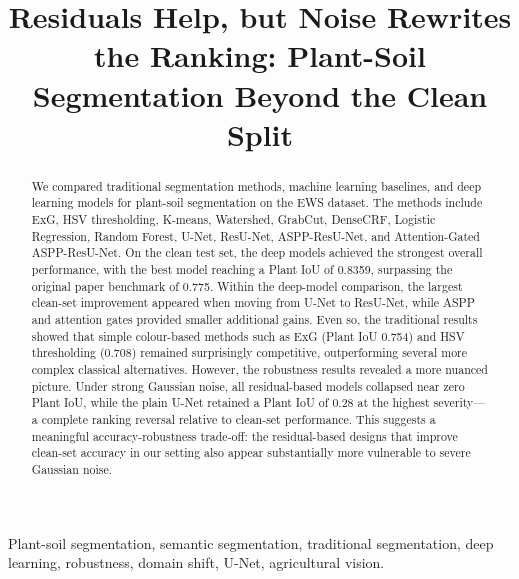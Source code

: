\documentclass[conference]{IEEEtran}
\begin{document}
\title{Residuals Help, but Noise Rewrites the Ranking: Plant-Soil Segmentation Beyond the Clean Split}

\author{
}

\maketitle

\begin{abstract}
We compared traditional segmentation methods, machine learning
baselines, and deep learning models for plant-soil segmentation on the
EWS dataset. The methods include ExG, HSV thresholding, K-means,
Watershed, GrabCut, DenseCRF, Logistic Regression, Random Forest, U-Net,
ResU-Net, ASPP-ResU-Net, and Attention-Gated ASPP-ResU-Net. On the clean
test set, the deep models achieved the strongest overall performance,
with the best model reaching a Plant IoU of 0.8359, surpassing the
original paper benchmark of 0.775. Within the deep-model comparison,
the largest clean-set improvement appeared when moving from U-Net to
ResU-Net, while ASPP and attention gates provided smaller additional
gains. Even so, the traditional results showed that simple colour-based
methods such as ExG (Plant IoU 0.754) and HSV thresholding (0.708)
remained surprisingly competitive, outperforming several more complex
classical alternatives. However, the robustness results revealed a more
nuanced picture. Under strong Gaussian noise, all residual-based models
collapsed near zero Plant IoU, while the plain U-Net retained a Plant
IoU of 0.28 at the highest severity---a complete ranking reversal
relative to clean-set performance. This suggests a meaningful
accuracy-robustness trade-off: the residual-based designs that improve
clean-set accuracy in our setting also appear substantially more
vulnerable to severe Gaussian noise.
\end{abstract}

\begin{IEEEkeywords}
Plant-soil segmentation, semantic segmentation, traditional segmentation,
deep learning, robustness, domain shift, U-Net, agricultural vision.
\end{IEEEkeywords}
\end{document}
